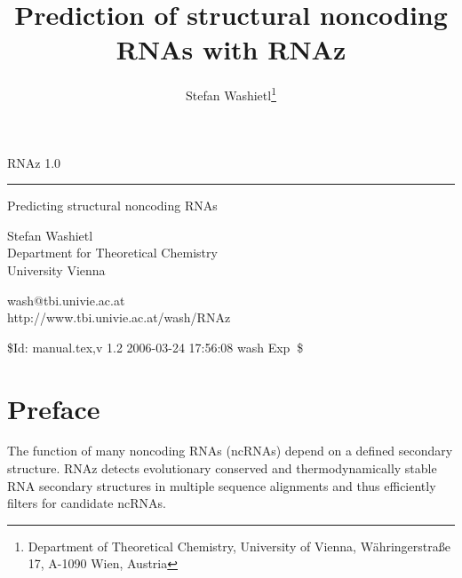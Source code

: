 \documentclass[11pt]{article}
\begin{document}
\title{Prediction of structural noncoding RNAs with RNAz} 
\author{Stefan Washietl\footnote{Department of Theoretical Chemistry, University of
  Vienna, W{\"a}hringerstra{\ss}e 17, A-1090 Wien, Austria}} 

\thispagestyle{empty}

\vspace*{5cm}

\huge 
\sf

RNAz 1.0

\vspace*{-0.8cm}
\rule{\textwidth}{1mm}

\large
\vspace*{-0.3cm}
\hfill Predicting structural noncoding RNAs

\vspace{3cm}

\vfill

Stefan Washietl\\Department for Theoretical
Chemistry\\University Vienna

wash@tbi.univie.ac.at\\
http://www.tbi.univie.ac.at/\raisebox{-0.9ex}{\~{ }}wash/RNAz

\normalfont

\newpage
\thispagestyle{empty}
\vspace*{0.9\textheight}

\begin{center}
  \$Id: manual.tex,v 1.2 2006-03-24 17:56:08 wash Exp $\ $\$
\end{center}


\newpage


\tableofcontents

\newpage


\section*{Preface}

The function of many noncoding RNAs (ncRNAs) depend on a defined secondary
structure. RNAz detects evolutionary conserved and thermodynamically stable
RNA secondary structures in multiple sequence alignments and thus
efficiently filters for candidate ncRNAs.
\end{document}
